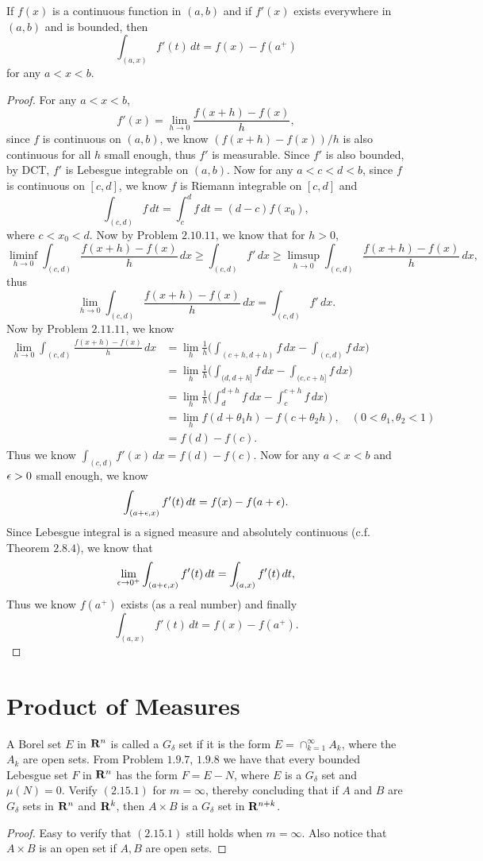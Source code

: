 \begin{pro}%
	If $f(x)$ is a continuous function in $(a,b)$ and if $f'(x)$ exists everywhere in $(a,b)$ and is bounded, then
	\[\int_{(a,x)} f'(t)\,dt=f(x)-f(a^+)\]
	for any $a<x<b$.
\end{pro}
\begin{proof}
	For any $a<x<b$, 
	\[f'(x)=\lim_{h\to0}\frac{f(x+h)-f(x)}{h},\]
	since $f$ is continuous on $(a,b)$, we know $(f(x+h)-f(x))/h$ is also continuous for all $h$ small enough, thus $f'$ is measurable. Since $f'$ is also bounded, by DCT, $f'$ is Lebesgue integrable on $(a,b)$. Now for any $a<c<d<b$, since $f$ is continuous on $[c,d]$, we know $f$ is Riemann integrable on $[c,d]$ and 
	\[\int_{(c,d)} f\,dt=\int_c^d f\,dt=(d-c)f(x_0),\]
	where $c<x_0<d$. Now by Problem $2.10.11$, we know that for $h>0$,
	\[\liminf_{h\to0}\int_{(c,d)} \frac{f(x+h)-f(x)}{h}\,dx\geq \int_{(c,d)} f'\,dx\geq \limsup_{h\to0}\int_{(c,d)} \frac{f(x+h)-f(x)}{h}\,dx,\]
	thus \[\lim_{h\to0}\int_{(c,d)} \frac{f(x+h)-f(x)}{h}\,dx =\int_{(c,d)} f'\,dx.\]
	Now by Problem $2.11.11$, we know
	\begin{align*}
	 \lim_{h\to0}\int_{(c,d)} \frac{f(x+h)-f(x)}{h}\,dx
	 &=\lim_h \frac{1}{h}\bigg(\int_{(c+h,d+h)} f\,dx-\int_{(c,d)} f\,dx\bigg)\\
	 &=\lim_h \frac{1}{h}\bigg(\int_{(d,d+h]} f\,dx-\int_{(c,c+h]} f\,dx\bigg)\\
	 &=\lim_h \frac{1}{h}\bigg(\int_d^{d+h} f\,dx-\int_c^{c+h} f\,dx\bigg)\\
	 &=\lim_h f(d+\theta_1 h)-f(c+\theta_2 h),\quad(0<\theta_1,\theta_2<1)\\
	 &=f(d)-f(c).
	 \end{align*}
	 Thus we  know $\int_{(c,d)}f'(x)\,dx=f(d)-f(c)$.
	 Now for any $a<x<b$ and $\epsilon>0$ small enough, we know
	 \[\int_{(a+\epsilon,x)}f'(t)\,dt=f(x)-f(a+\epsilon).\]
	 Since Lebesgue integral is a signed measure and absolutely continuous (c.f. Theorem $2.8.4$), we know that \
	 \[\lim_{\epsilon\to0^+}\int_{(a+\epsilon,x)}f'(t)\,dt=\int_{(a,x)}f'(t)\,dt,\]
	 Thus we know $f(a^+)$ exists (as a real number) and finally
	 \[\int_{(a,x)} f'(t)\,dt=f(x)-f(a^+).\]
\end{proof}

\section{Product of Measures}
\begin{pro}%
	A Borel set $E$ in $\mathbf{R}^n$ is called a $G_{\delta}$ set if it is the form $E=\cap_{k=1}^{\infty} A_k$, where the $A_k$ are open sets. From Problem $1.9.7$, $1.9.8$ we have that every bounded Lebesgue set $F$ in $\mathbf{R}^n$ has the form $F=E-N$, where $E$ is a $G_{\delta}$ set and $\mu(N)=0$. Verify $(2.15.1)$ for $m=\infty$, thereby concluding that if $A$ and $B$ are $G_{\delta}$ sets in $\mathbf{R}^n$ and $\mathbf{R}^k$, then $A\times B$ is a $G_{\delta}$ set in $\mathbf{R}^{n+k}$.
\end{pro}
\begin{proof}
	Easy to verify that $(2.15.1)$ still holds when $m=\infty$. Also notice that $A\times B$ is an open set if $A,B$ are open sets.
\end{proof}

